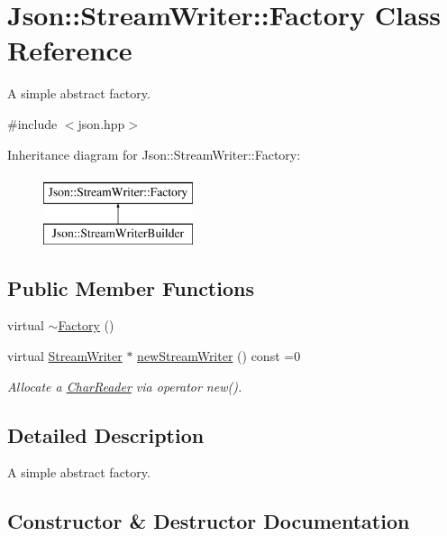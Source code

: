 \hypertarget{classJson_1_1StreamWriter_1_1Factory}{}\section{Json\+:\+:Stream\+Writer\+:\+:Factory Class Reference}
\label{classJson_1_1StreamWriter_1_1Factory}


A simple abstract factory.  




{\ttfamily \#include $<$json.\+hpp$>$}

Inheritance diagram for Json\+:\+:Stream\+Writer\+:\+:Factory\+:\begin{figure}[H]
\begin{center}
\leavevmode
\includegraphics[height=2.000000cm]{classJson_1_1StreamWriter_1_1Factory}
\end{center}
\end{figure}
\subsection*{Public Member Functions}
\begin{DoxyCompactItemize}
\item 
virtual \hyperlink{classJson_1_1StreamWriter_1_1Factory_ad334ad5e81e3b9b1768620a446366ff1}{$\sim$\+Factory} ()
\item 
virtual \hyperlink{classJson_1_1StreamWriter}{Stream\+Writer} $\ast$ \hyperlink{classJson_1_1StreamWriter_1_1Factory_a9d30ec53e8288cd53befccf1009c5f31}{new\+Stream\+Writer} () const =0
\begin{DoxyCompactList}\small\item\em Allocate a \hyperlink{classJson_1_1CharReader}{Char\+Reader} via operator new(). \end{DoxyCompactList}\end{DoxyCompactItemize}


\subsection{Detailed Description}
A simple abstract factory. 

\subsection{Constructor \& Destructor Documentation}
